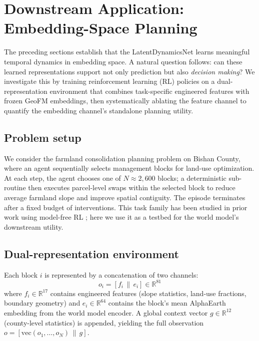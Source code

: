 \documentclass{article}
\begin{document}
\section{Downstream Application: Embedding-Space Planning}
\label{sec:planning}

The preceding sections establish that the LatentDynamicsNet learns meaningful temporal dynamics in embedding space. A natural question follows: can these learned representations support not only prediction but also \textit{decision making}? We investigate this by training reinforcement learning (RL) policies on a dual-representation environment that combines task-specific engineered features with frozen GeoFM embeddings, then systematically ablating the feature channel to quantify the embedding channel's standalone planning utility.

\subsection{Problem setup}

We consider the farmland consolidation planning problem on Bishan County, where an agent sequentially selects management blocks for land-use optimization. At each step, the agent chooses one of $N \approx 2{,}600$ blocks; a deterministic sub-routine then executes parcel-level swaps within the selected block to reduce average farmland slope and improve spatial contiguity. The episode terminates after a fixed budget of interventions. This task family has been studied in prior work using model-free RL \citep{zhou2026drl}; here we use it as a testbed for the world model's downstream utility.

\subsection{Dual-representation environment}

Each block $i$ is represented by a concatenation of two channels:
\begin{equation}
o_i = [f_i \,\|\, e_i] \in \mathbb{R}^{81}
\end{equation}
where $f_i \in \mathbb{R}^{17}$ contains engineered features (slope statistics, land-use fractions, boundary geometry) and $e_i \in \mathbb{R}^{64}$ contains the block's mean AlphaEarth embedding from the world model encoder. A global context vector $g \in \mathbb{R}^{12}$ (county-level statistics) is appended, yielding the full observation $o = [\text{vec}(o_1, \ldots, o_N) \,\|\, g]$.
\end{document}
